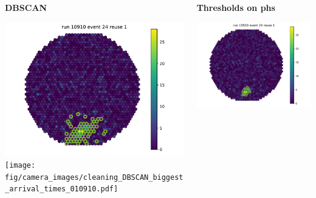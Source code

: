 \begin{withoutheadline}
  \begin{frame}{}
    \begin{columns}[onlytextwidth]
      \begin{column}{0.33\textwidth}
        \centering
        \textbf{DBSCAN}\par\medskip
        \includegraphics[width=\textwidth, page=29]{fig/camera_images/cleaning_DBSCAN_biggest_pe_010910.pdf}
        \texttt{[image: fig/camera\_images/cleaning\_DBSCAN\_biggest\_arrival\_times\_010910.pdf]}
      \end{column}
    \hfill%
      \begin{column}{0.33\textwidth}
        \centering
        \textbf{Thresholds on phs}\par\medskip
        \includegraphics[width=\textwidth, page=22]{fig/camera_images/cleaning_thresh_pe_010910.pdf}

\end{column}
\end{columns}
\end{frame}
\end{withoutheadline}
